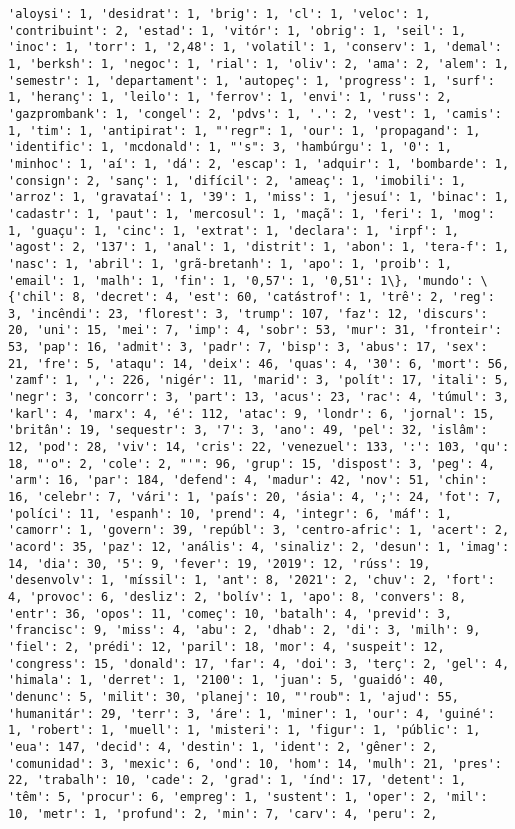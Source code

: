 \documentclass[11pt]{article}
\begin{document}
\begin{Verbatim}[commandchars=\\\{\}]
'aloysi': 1, 'desidrat': 1, 'brig': 1, 'cl': 1, 'veloc': 1, 'contribuint': 2, 'estad': 1, 'vitór': 1, 'obrig': 1, 'seil': 1, 'inoc': 1, 'torr': 1, '2,48': 1, 'volatil': 1, 'conserv': 1, 'demal': 1, 'berksh': 1, 'negoc': 1, 'rial': 1, 'oliv': 2, 'ama': 2, 'alem': 1, 'semestr': 1, 'departament': 1, 'autopeç': 1, 'progress': 1, 'surf': 1, 'heranç': 1, 'leilo': 1, 'ferrov': 1, 'envi': 1, 'russ': 2, 'gazprombank': 1, 'congel': 2, 'pdvs': 1, '.': 2, 'vest': 1, 'camis': 1, 'tim': 1, 'antipirat': 1, "'regr": 1, 'our': 1, 'propagand': 1, 'identific': 1, 'mcdonald': 1, "'s": 3, 'hambúrgu': 1, '0': 1, 'minhoc': 1, 'aí': 1, 'dá': 2, 'escap': 1, 'adquir': 1, 'bombarde': 1, 'consign': 2, 'sanç': 1, 'difícil': 2, 'ameaç': 1, 'imobili': 1, 'arroz': 1, 'gravataí': 1, '39': 1, 'miss': 1, 'jesuí': 1, 'binac': 1, 'cadastr': 1, 'paut': 1, 'mercosul': 1, 'maçã': 1, 'feri': 1, 'mog': 1, 'guaçu': 1, 'cinc': 1, 'extrat': 1, 'declara': 1, 'irpf': 1, 'agost': 2, '137': 1, 'anal': 1, 'distrit': 1, 'abon': 1, 'tera-f': 1, 'nasc': 1, 'abril': 1, 'grã-bretanh': 1, 'apo': 1, 'proib': 1, 'email': 1, 'malh': 1, 'fin': 1, '0,57': 1, '0,51': 1\}, 'mundo': \{'chil': 8, 'decret': 4, 'est': 60, 'catástrof': 1, 'trê': 2, 'reg': 3, 'incêndi': 23, 'florest': 3, 'trump': 107, 'faz': 12, 'discurs': 20, 'uni': 15, 'mei': 7, 'imp': 4, 'sobr': 53, 'mur': 31, 'fronteir': 53, 'pap': 16, 'admit': 3, 'padr': 7, 'bisp': 3, 'abus': 17, 'sex': 21, 'fre': 5, 'ataqu': 14, 'deix': 46, 'quas': 4, '30': 6, 'mort': 56, 'zamf': 1, ',': 226, 'nigér': 11, 'marid': 3, 'polít': 17, 'itali': 5, 'negr': 3, 'concorr': 3, 'part': 13, 'acus': 23, 'rac': 4, 'túmul': 3, 'karl': 4, 'marx': 4, 'é': 112, 'atac': 9, 'londr': 6, 'jornal': 15, 'britân': 19, 'sequestr': 3, '7': 3, 'ano': 49, 'pel': 32, 'islâm': 12, 'pod': 28, 'viv': 14, 'cris': 22, 'venezuel': 133, ':': 103, 'qu': 18, "'o": 2, 'cole': 2, "'": 96, 'grup': 15, 'dispost': 3, 'peg': 4, 'arm': 16, 'par': 184, 'defend': 4, 'madur': 42, 'nov': 51, 'chin': 16, 'celebr': 7, 'vári': 1, 'país': 20, 'ásia': 4, ';': 24, 'fot': 7, 'políci': 11, 'espanh': 10, 'prend': 4, 'integr': 6, 'máf': 1, 'camorr': 1, 'govern': 39, 'repúbl': 3, 'centro-afric': 1, 'acert': 2, 'acord': 35, 'paz': 12, 'anális': 4, 'sinaliz': 2, 'desun': 1, 'imag': 14, 'dia': 30, '5': 9, 'fever': 19, '2019': 12, 'rúss': 19, 'desenvolv': 1, 'míssil': 1, 'ant': 8, '2021': 2, 'chuv': 2, 'fort': 4, 'provoc': 6, 'desliz': 2, 'bolív': 1, 'apo': 8, 'convers': 8, 'entr': 36, 'opos': 11, 'começ': 10, 'batalh': 4, 'previd': 3, 'francisc': 9, 'miss': 4, 'abu': 2, 'dhab': 2, 'di': 3, 'milh': 9, 'fiel': 2, 'prédi': 12, 'paril': 18, 'mor': 4, 'suspeit': 12, 'congress': 15, 'donald': 17, 'far': 4, 'doi': 3, 'terç': 2, 'gel': 4, 'himala': 1, 'derret': 1, '2100': 1, 'juan': 5, 'guaidó': 40, 'denunc': 5, 'milit': 30, 'planej': 10, "'roub": 1, 'ajud': 55, 'humanitár': 29, 'terr': 3, 'áre': 1, 'miner': 1, 'our': 4, 'guiné': 1, 'robert': 1, 'muell': 1, 'misteri': 1, 'figur': 1, 'públic': 1, 'eua': 147, 'decid': 4, 'destin': 1, 'ident': 2, 'gêner': 2, 'comunidad': 3, 'mexic': 6, 'ond': 10, 'hom': 14, 'mulh': 21, 'pres': 22, 'trabalh': 10, 'cade': 2, 'grad': 1, 'índ': 17, 'detent': 1, 'têm': 5, 'procur': 6, 'empreg': 1, 'sustent': 1, 'oper': 2, 'mil': 10, 'metr': 1, 'profund': 2, 'min': 7, 'carv': 4, 'peru': 2, 
\end{Verbatim}
\end{document}
